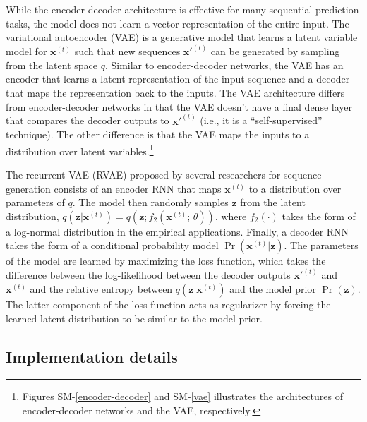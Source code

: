 \documentclass[hidelinks,12pt]{article}
\begin{document}
While the encoder-decoder architecture is effective for many sequential prediction tasks, the model does not learn a vector representation of the entire input. The variational autoencoder (VAE) \citep{kingma2013auto} is a generative model that learns a latent variable model for $\boldsymbol{x}^{(t)}$ such that new sequences $\boldsymbol{x'}^{(t)}$ can be generated by sampling from the latent space $q$. Similar to encoder-decoder networks, the VAE has an encoder that learns a latent representation of the input sequence and a decoder that maps the representation back to the inputs. The VAE architecture differs from encoder-decoder networks in that the VAE doesn't have a final dense layer that compares the decoder outputs to  $\boldsymbol{x'}^{(t)}$ (i.e., it is a ``self-supervised'' technique). The other difference is that the VAE maps the inputs to a distribution over latent variables.\footnote{Figures SM-\ref{encoder-decoder} and SM-\ref{vae} illustrates the architectures of encoder-decoder networks and the VAE, respectively.} 

The recurrent VAE (RVAE) proposed by several researchers \citep{fabius2014variational, chung2015recurrent,bowman2015generating} for sequence generation consists of an encoder RNN that maps $\boldsymbol{x}^{(t)}$ to a distribution over parameters of $q$. The model then randomly samples $\boldsymbol{z}$ from the latent distribution, $q(\boldsymbol{z} | \boldsymbol{x}^{(t)}) = q (\boldsymbol{z}; f_2(\boldsymbol{x}^{(t)};\, \theta))$, where $f_2(\cdot)$ takes the form of a log-normal distribution in the empirical applications. Finally, a decoder RNN takes the form of a conditional probability model $\Pr (\boldsymbol{x}^{(t)} | \boldsymbol{z})$. The parameters of the model are learned by maximizing the loss function, which takes the difference between the log-likelihood between the decoder outputs $\boldsymbol{x'}^{(t)}$ and $\boldsymbol{x}^{(t)}$ and the relative entropy between  $q(\boldsymbol{z} | \boldsymbol{x}^{(t)})$ and the model prior $\Pr (\boldsymbol{z})$. The latter component of the loss function acts as regularizer by forcing the learned latent distribution to be similar to the model prior. 

\subsection{Implementation details} 
\end{document}
